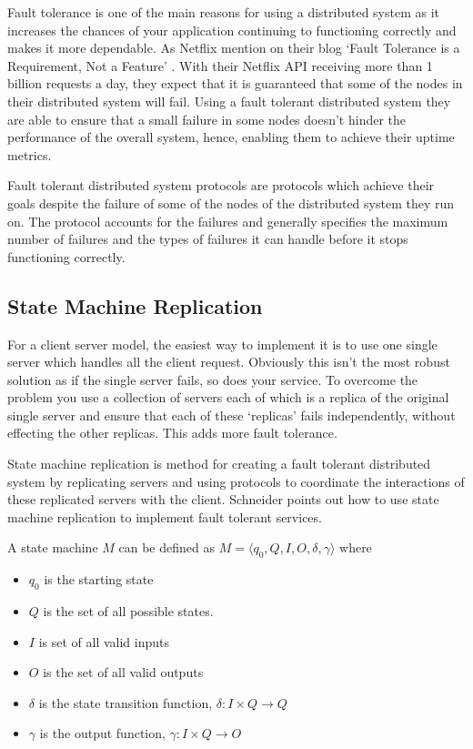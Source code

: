 Fault tolerance is one of the main reasons for using a distributed system as it
increases the chances of your application continuing to functioning correctly and
makes it more dependable. As Netflix mention on their blog
`Fault Tolerance is a Requirement, Not a Feature' \cite{20}.
With their Netflix API receiving more than 1 billion requests a day, they expect
that it is guaranteed that some of the nodes in their distributed system will fail.
Using a fault tolerant distributed system they are able to ensure that a small failure
in some nodes doesn't hinder the performance of the overall system, hence,
enabling them to achieve their uptime metrics.

Fault tolerant distributed system protocols are protocols which achieve their
goals despite the failure of some of the nodes of the distributed system they run on.
The protocol accounts for the failures and generally specifies the maximum number of
failures and the types of failures it can handle before it stops functioning correctly.

\subsection{State Machine Replication}

For a client server model, the easiest way to implement it is to use one single server
which handles all the client request. Obviously this isn't the most robust solution
as if the single server fails, so does your service. To overcome the problem you
use a collection of servers each of which is a replica of the original single server and
ensure that each of these `replicas' fails independently, without effecting the other replicas.
This adds more fault tolerance.

State machine replication is method for creating a fault tolerant distributed system
by replicating servers and using protocols to coordinate the interactions of these
replicated servers with the client. Schneider \cite{1} points out how to use
state machine replication to implement fault tolerant services.

A state machine $M$ can be defined as $M = \langle q_0, Q, I, O, \delta, \gamma \rangle$ where
\begin{itemize}
  \item $q_0$ is the starting state
  \item $Q$ is the set of all possible states.
  \item $I$ is set of all valid inputs
  \item $O$ is the set of all valid outputs
  \item $\delta$ is the state transition function, $\delta : I \times Q \rightarrow Q$
  \item $\gamma$ is the output function, $\gamma : I \times Q \rightarrow O$
\end{itemize}

